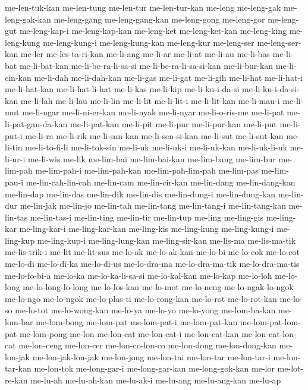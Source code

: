 {me-len-tuk-kan me-len-tung me-len-tur me-len-tur-kan me-leng me-leng-gak
me-leng-gak-kan me-leng-gang me-leng-gang-kan me-leng-gong me-leng-gor
me-leng-gut me-leng-kap-i me-leng-kap-kan me-leng-ket me-leng-ket-kan
me-leng-king me-leng-kung me-leng-kung-i me-leng-kung-kan me-leng-kur
me-leng-ser me-leng-ser-kan me-ler me-les-ta-ri-kan me-li-ang me-li-ar
me-li-at me-li-au me-li-bas me-li-bat me-li-bat-kan me-li-be-ra-li-sa-si
me-li-be-ra-li-sa-si-kan me-li-bur-kan me-li-cin-kan me-li-dah
me-li-dah-kan me-li-gas me-li-gat me-li-gih me-li-hat me-li-hat-i
me-li-hat-kan me-li-hat-li-hat me-li-kas me-li-kip me-li-ku-i-da-si
me-li-ku-i-da-si-kan me-li-lah me-li-lau me-li-lin me-li-lit me-li-lit-i
me-li-lit-kan me-li-mau-i me-li-mut me-li-ngar me-li-ni-er-kan me-li-nyak
me-li-nyar me-li-o-ris-me me-li-pat me-li-pat-gan-da-kan me-li-pat-kan
me-li-pit me-li-pur me-li-pur-kan me-li-put me-li-put-i me-li-ra me-li-rik
me-li-san-kan me-li-sen-si-kan me-li-sut me-li-sut-kan me-li-tin
me-li-to-fi-li me-li-tok-sin me-li-uk me-li-uk-i me-li-uk-kan
me-li-uk-li-uk me-li-ur-i me-li-wis me-lik me-lim-bai me-lim-bai-kan
me-lim-bang me-lim-bur me-lim-pah me-lim-pah-i me-lim-pah-kan
me-lim-pah-lim-pah me-lim-pas me-lim-pau-i me-lin-cah-lin-cah me-lin-cam
me-lin-cir-kan me-lin-dang me-lin-dang-kan me-lin-dap me-lin-das
me-lin-dik me-lin-dis me-lin-dung-i me-lin-dung-kan me-lin-dur me-lin-jak
me-lin-jo me-lin-tah me-lin-tang me-lin-tang-i me-lin-tang-kan me-lin-tas
me-lin-tas-i me-lin-ting me-lin-tir me-lin-tup me-ling me-ling-gis
me-ling-kar me-ling-kar-i me-ling-kar-kan me-ling-kis me-ling-kung
me-ling-kung-i me-ling-kup me-ling-kup-i me-ling-lung-kan me-ling-sir-kan
me-lis-ma me-lis-ma-tik me-lis-trik-i me-lit me-lit-sus me-lo-ak
me-lo-ak-kan me-lo-bi me-lo-cok me-lo-cot me-lo-di me-lo-di-ka me-lo-di-us
me-lo-dra-ma me-lo-dra-ma-tik me-lo-dra-ma-tis me-lo-fo-bi-a me-lo-ka
me-lo-ka-li-sa-si me-lo-kal-kan me-lo-kap me-lo-loh me-lo-long
me-lo-long-lo-long me-lo-los-kan me-lo-mot me-lo-neng me-lo-ngak-lo-ngok
me-lo-ngo me-lo-ngok me-lo-plas-ti me-lo-rong-kan me-lo-rot me-lo-rot-kan
me-lo-so me-lo-tot me-lo-wong-kan me-lo-ya me-lo-yo me-lo-yong
me-lom-ba-kan me-lom-bar me-lom-bong me-lom-pat me-lom-pat-i
me-lom-pat-kan me-lom-pat-lom-pat me-lom-pong me-lon me-lon-cat
me-lon-cat-i me-lon-cat-kan me-lon-cat-lon-cat me-lon-ceng me-lon-cer
me-lon-co-lon-co me-lon-dong me-lon-dong-kan me-lon-jak me-lon-jak-lon-jak
me-lon-jong me-lon-tai me-lon-tar me-lon-tar-i me-lon-tar-kan me-lon-tok
me-long-gar-i me-long-gar-kan me-long-gok-kan me-lor me-lot-re-kan
me-lu-ah me-lu-ah-kan me-lu-ak-i me-lu-ang me-lu-ang-kan me-lu-ap
}
